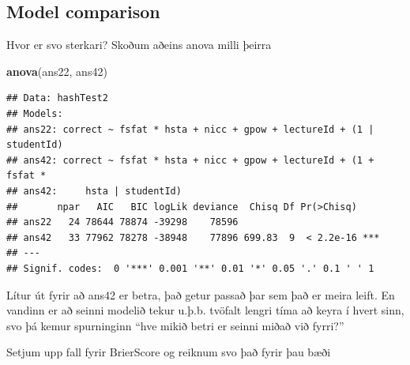 \documentclass[
]{article}
\newenvironment{Shaded}{\begin{snugshade}}{\end{snugshade}}
\newcommand{\ControlFlowTok}[1]{\textcolor[rgb]{0.13,0.29,0.53}{\textbf{#1}}}
\newcommand{\DataTypeTok}[1]{\textcolor[rgb]{0.13,0.29,0.53}{#1}}
\newcommand{\DecValTok}[1]{\textcolor[rgb]{0.00,0.00,0.81}{#1}}
\newcommand{\KeywordTok}[1]{\textcolor[rgb]{0.13,0.29,0.53}{\textbf{#1}}}
\newcommand{\NormalTok}[1]{#1}
\newcommand{\OperatorTok}[1]{\textcolor[rgb]{0.81,0.36,0.00}{\textbf{#1}}}
\newcommand{\StringTok}[1]{\textcolor[rgb]{0.31,0.60,0.02}{#1}}
\begin{document}
\hypertarget{model-comparison}{%
\subsection{Model comparison}\label{model-comparison}}

Hvor er svo sterkari? Skoðum aðeins anova milli þeirra

\begin{Shaded}
\begin{Highlighting}[]
\KeywordTok{anova}\NormalTok{(ans22, ans42)}
\end{Highlighting}
\end{Shaded}

\begin{verbatim}
## Data: hashTest2
## Models:
## ans22: correct ~ fsfat * hsta + nicc + gpow + lectureId + (1 | studentId)
## ans42: correct ~ fsfat * hsta + nicc + gpow + lectureId + (1 + fsfat * 
## ans42:     hsta | studentId)
##       npar   AIC   BIC logLik deviance  Chisq Df Pr(>Chisq)    
## ans22   24 78644 78874 -39298    78596                         
## ans42   33 77962 78278 -38948    77896 699.83  9  < 2.2e-16 ***
## ---
## Signif. codes:  0 '***' 0.001 '**' 0.01 '*' 0.05 '.' 0.1 ' ' 1
\end{verbatim}

Lítur út fyrir að ans42 er betra, það getur passað þar sem það er meira leift. En vandinn er að seinni modelið tekur u.þ.b. tvöfalt lengri tíma að keyra í hvert sinn, svo þá kemur spurninginn ``hve mikið betri er seinni miðað við fyrri?''

Setjum upp fall fyrir BrierScore og reiknum svo það fyrir þau bæði

\begin{Shaded}
\end{Shaded}
\end{document}
